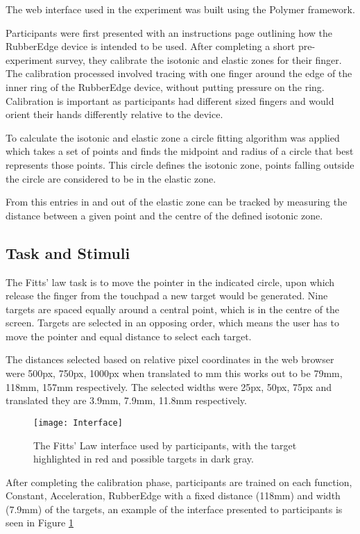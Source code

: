 The web interface used in the experiment was built using the Polymer framework\cite{WelcomeProject}.

Participants were first presented with an instructions page outlining how the RubberEdge device is intended to be used. After completing a short pre-experiment survey, they calibrate the isotonic and elastic zones for their finger.
The calibration processed involved tracing with one finger around the edge of the inner ring of the RubberEdge device, without putting pressure on the ring. Calibration is important as participants had different sized fingers and would orient their hands differently relative to the device.

To calculate the isotonic and elastic zone a circle fitting algorithm\cite{Maisonobe2007FindingPoints} was applied which takes a set of points and finds the midpoint and radius of a circle that best represents those points. This circle defines the isotonic zone, points falling outside the circle are considered to be in the elastic zone.

From this entries in and out of the elastic zone can be tracked by measuring the distance between a given point and the centre of the defined isotonic zone.

\subsection{Task and Stimuli}
The Fitts' law task is to move the pointer in the indicated circle, upon which release the finger from the touchpad a new target would be generated. Nine targets are spaced equally around a central point, which is in the centre of the screen. Targets are selected in an opposing order, which means the user has to move the pointer and equal distance to select each target.

The distances selected based on relative pixel coordinates in the web browser were 500px, 750px, 1000px when translated to mm this works out to be 79mm, 118mm, 157mm respectively.
The selected widths were 25px, 50px, 75px and translated they are 3.9mm, 7.9mm, 11.8mm respectively.

\begin{figure}[h]
    \centering
    \texttt{[image: Interface]}
    \caption{The Fitts' Law interface used by participants, with the target highlighted in red and possible targets in dark gray.}
    \label{fig:interface}
\end{figure}

After completing the calibration phase, participants are trained on each function, {Constant, Acceleration, RubberEdge} with a fixed distance (118mm) and width (7.9mm) of the targets, an example of the interface presented to participants is seen in Figure \ref{fig:interface}

